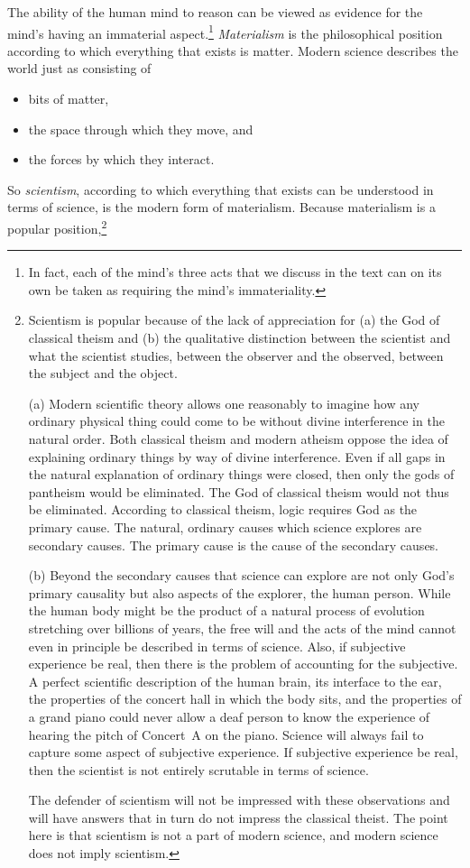 The ability of the human mind to reason can be viewed as evidence for the
mind's having an immaterial aspect.\footnote{%
   In fact, each of the mind's three acts that we discuss in the text can on
   its own be taken as requiring the mind's immateriality.
}
\emph{Materialism} is the philosophical position according to which everything
that exists is matter.  Modern science describes the world just as consisting
of
\begin{itemize}
   \item bits of matter,
   \item the space through which they move, and
   \item the forces by which they interact.
\end{itemize}
So \emph{scientism}, according to which everything that exists can be
understood in terms of science, is the modern form of materialism.  Because
materialism is a popular position,\footnote{%
   Scientism is popular because of the lack of appreciation for (a) the God of
   classical theism and (b) the qualitative distinction between the scientist
   and what the scientist studies, between the observer and the observed,
   between the subject and the object.

   (a) Modern scientific theory allows one reasonably to imagine how any
   ordinary physical thing could come to be without divine interference in the
   natural order. Both classical theism and modern atheism oppose the idea of
   explaining ordinary things by way of divine interference.  Even if all gaps
   in the natural explanation of ordinary things were closed, then only the
   gods of pantheism would be eliminated. The God of classical theism would not
   thus be eliminated.  According to classical theism, logic requires God as
   the primary cause. The natural, ordinary causes which science explores are
   secondary causes. The primary cause is the cause of the secondary causes.
   
   (b) Beyond the secondary causes that science can explore are not only God's
   primary causality but also aspects of the explorer, the human person. While
   the human body might be the product of a natural process of evolution
   stretching over billions of years, the free will and the acts of the mind
   cannot even in principle be described in terms of science. Also, if
   subjective experience be real, then there is the problem of accounting for
   the subjective.  A perfect scientific description of the human brain, its
   interface to the ear, the properties of the concert hall in which the body
   sits, and the properties of a grand piano could never allow a deaf person to
   know the experience of hearing the pitch of Concert~A on the piano.  Science
   will always fail to capture some aspect of subjective experience. If
   subjective experience be real, then the scientist is not entirely scrutable
   in terms of science.

   The defender of scientism will not be impressed with these observations and
   will have answers that in turn do not impress the classical theist. The
   point here is that scientism is not a part of modern science, and modern
   science does not imply scientism.
}
